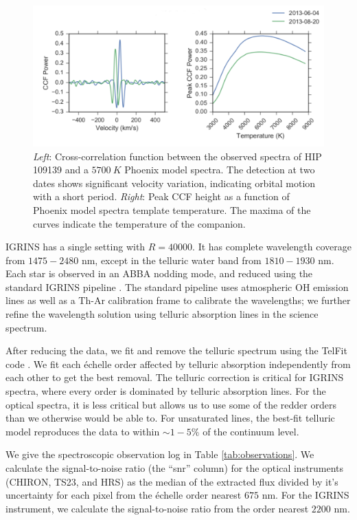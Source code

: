 \documentclass{emulateapj}
\begin{document}
\begin{figure}
\includegraphics[width=\textwidth]{HIP_109139.pdf}
\caption{\emph{Left}: Cross-correlation function between the observed spectra of HIP 109139 and a $5700\ K$ Phoenix model spectra. The detection at two dates shows significant velocity variation, indicating orbital motion with a short period. \emph{Right}: Peak CCF height as a function of Phoenix model spectra template temperature. The maxima of the curves indicate the temperature of the companion.}
\label{fig:ccf}
\end{figure}

IGRINS has a single setting with $R = 40000$. It has complete wavelength coverage from $1475-2480$ nm, except in the telluric water band from $1810 - 1930$ nm. Each star is observed in an ABBA nodding mode, and reduced using the standard IGRINS pipeline \citep{IGRINS_plp_v2}. The standard pipeline uses atmospheric OH emission lines as well as a Th-Ar calibration frame to calibrate the wavelengths; we further refine the wavelength solution using telluric absorption lines in the science spectrum.

After reducing the data, we fit and remove the telluric spectrum using the TelFit code \citep{Gullikson2014}. We fit each \'echelle order affected by telluric absorption independently from each other to get the best removal. The telluric correction is critical for IGRINS spectra, where every order is dominated by telluric absorption lines. For the optical spectra, it is less critical but allows us to use some of the redder orders than we otherwise would be able to. For unsaturated lines, the best-fit telluric model reproduces the data to within $\sim 1-5\%$ of the continuum level.

We give the spectroscopic observation log in Table \ref{tab:observations}. We calculate the signal-to-noise ratio (the ``snr'' column) for the optical instruments (CHIRON, TS23, and HRS) as the median of the extracted flux divided by it's uncertainty for each pixel from the \'echelle order nearest $675$ nm. For the IGRINS instrument, we calculate the signal-to-noise ratio from the order nearest $2200$ nm.
\end{document}
